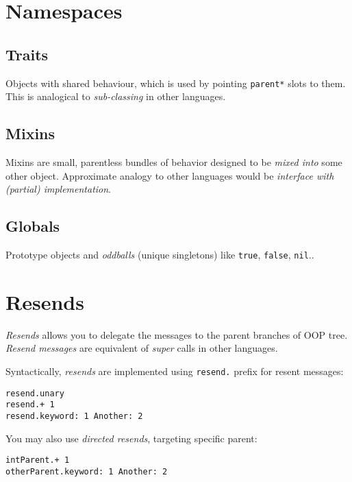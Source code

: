\documentclass[10pt]{article}
\begin{document}
\begin{multicols*}{3}
\pagebreak %
\section{Namespaces}

\subsection{Traits}
Objects with shared behaviour, which is used by pointing \texttt{parent*} slots to them. This is analogical to \textit{sub-classing} in other languages.



\subsection{Mixins}
Mixins are small, parentless bundles of behavior designed to be \textit{mixed into} some other object. Approximate analogy to other languages would be \textit{interface with (partial) implementation}.



\subsection{Globals}
Prototype objects and \textit{oddballs} (unique singletons) like \texttt{true}, \texttt{false}, \texttt{nil}..




\section{Resends}
\textit{Resends} allows you to delegate the messages to the parent branches of OOP tree. \textit{Resend messages} are equivalent of \textit{super} calls in other languages.

Syntactically, \textit{resends} are implemented using \texttt{resend.} prefix for resent messages:

\begin{lstlisting}
resend.unary
resend.+ 1
resend.keyword: 1 Another: 2
\end{lstlisting}

You may also use \textit{directed resends}, targeting specific parent:

\begin{lstlisting}
intParent.+ 1
otherParent.keyword: 1 Another: 2
\end{lstlisting}





\end{multicols*}
\end{document}
